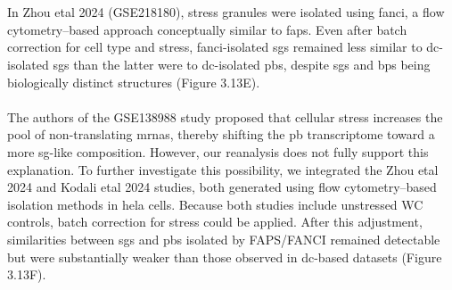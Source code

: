 \\
\\
In Zhou \gls{etal} 2024 (GSE218180)\cite{zhou_rna_2024}, stress granules were isolated using \gls{fanci}, a flow cytometry–based approach conceptually similar to \gls{faps}. Even after batch correction for cell type and stress, \gls{fanci}-isolated \glspl{sg} remained less similar to \gls{dc}-isolated \glspl{sg} than the latter were to \gls{dc}-isolated \glspl{pb}, despite \glspl{sg} and \glspl{bp} being biologically distinct structures (Figure 3.13E).
\\
\\
The authors of the GSE138988\cite{matheny_transcriptome-wide_2019} study proposed that cellular stress increases the pool of non-translating \glspl{mrna}, thereby shifting the \gls{pb} transcriptome toward a more \gls{sg}-like composition. However, our reanalysis does not fully support this explanation. To further investigate this possibility, we integrated the Zhou \gls{etal} 2024 and Kodali \gls{etal} 2024 studies, both generated using flow cytometry–based isolation methods in \gls{hela} cells. Because both studies include unstressed WC controls, batch correction for stress could be applied. After this adjustment, similarities between \glspl{sg} and \glspl{pb} isolated by FAPS/FANCI remained detectable but were substantially weaker than those observed in \gls{dc}-based datasets (Figure 3.13F).
\\

